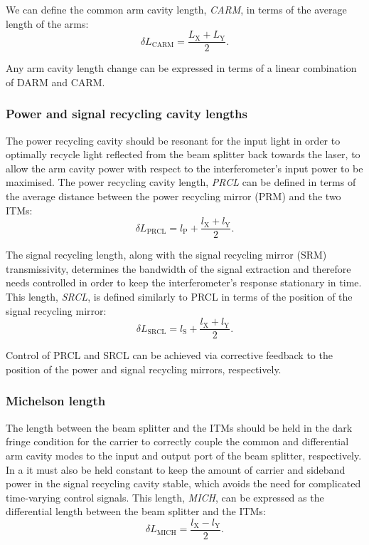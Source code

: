 We can define the common arm cavity length, \emph{\gls{CARM}}, in terms of the average length of the arms:
\begin{equation}
  \delta L_{\text{CARM}} = \frac{L_{\text{X}} + L_{\text{Y}}}{2}.
\end{equation}

Any arm cavity length change can be expressed in terms of a linear combination of \gls{DARM} and \gls{CARM}.

\subsubsection{Power and signal recycling cavity lengths}
The power recycling cavity should be resonant for the input light in order to optimally recycle light reflected from the beam splitter back towards the laser, to allow the arm cavity power with respect to the interferometer's input power to be maximised. The power recycling cavity length, \emph{\gls{PRCL}} can be defined in terms of the average distance between the power recycling mirror (\gls{PRM}) and the two \glspl{ITM}:
\begin{equation}
  \label{eq:prcl-length}
  \delta L_{\text{PRCL}} = l_{\text{P}} + \frac{l_{\text{X}} + l_{\text{Y}}}{2}.
\end{equation}

The signal recycling length, along with the signal recycling mirror (\gls{SRM}) transmissivity, determines the bandwidth of the signal extraction and therefore needs controlled in order to keep the interferometer's response stationary in time. This length, \emph{\gls{SRCL}}, is defined similarly to \gls{PRCL} in terms of the position of the signal recycling mirror:
\begin{equation}
  \label{eq:srcl-length}
  \delta L_{\text{SRCL}} = l_{\text{S}} + \frac{l_{\text{X}} + l_{\text{Y}}}{2}.
\end{equation}

Control of \gls{PRCL} and \gls{SRCL} can be achieved via corrective feedback to the position of the power and signal recycling mirrors, respectively.

\subsubsection{\label{sec:mich-length}Michelson length}
The length between the beam splitter and the \glspl{ITM} should be held in the dark fringe condition for the carrier to correctly couple the common and differential arm cavity modes to the input and output port of the beam splitter, respectively. In a \DRFPMI{} it must also be held constant to keep the amount of carrier and sideband power in the signal recycling cavity stable, which avoids the need for complicated time-varying control signals. This length, \emph{\gls{MICH}}, can be expressed as the differential length between the beam splitter and the \glspl{ITM}:
\begin{equation}
  \label{eq:mich-length}
  \delta L_{\text{MICH}} = \frac{l_{\text{X}} - l_{\text{Y}}}{2}.
\end{equation}

